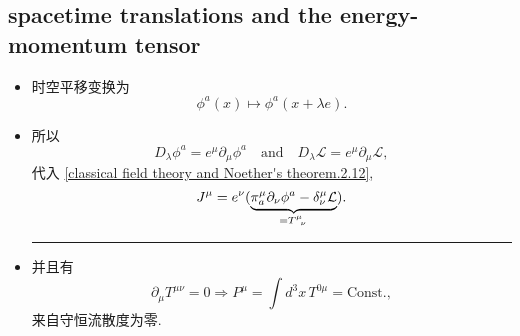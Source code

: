 \subsection{spacetime translations and the energy-momentum tensor} \label{classical field theory and Noether's theorem.2.3}
\begin{itemize}
	\item 时空平移变换为
	\begin{equation}
		\phi^a(x) \mapsto \phi^a(x + \lambda e).
	\end{equation}
	
	\item 所以
	\begin{equation}
		D_\lambda \phi^a = e^\mu \partial_\mu \phi^a \quad \text{and} \quad D_\lambda \mathcal{L} = e^\mu \partial_\mu \mathcal{L},
	\end{equation}
	代入 \eqref{classical field theory and Noether's theorem.2.12},
	\begin{equation}
		J^\mu = e^\nu (\underbrace{\pi_a^\mu \partial_\nu \phi^a - \delta^\mu_\nu \mathcal{L}}_{= \tensor{T}{^\mu_\nu}}).
	\end{equation}
	
	\noindent\rule[0.5ex]{\linewidth}{0.5pt} %
	
	\item 并且有
	\begin{equation} \label{classical field theory and Noether's theorem.2.19}
		\partial_\mu T^{\mu \nu} = 0 \Longrightarrow P^\mu = \int d^3 x \, T^{0 \mu} = \text{Const.},
	\end{equation}
	来自守恒流散度为零.
\end{itemize}

